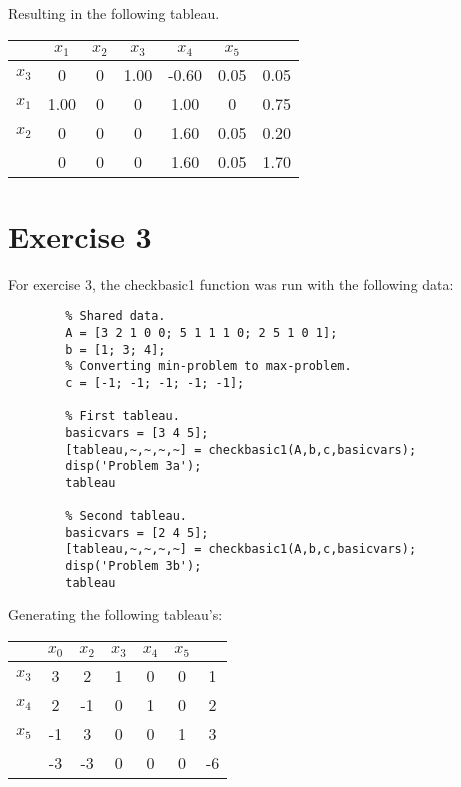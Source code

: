 \documentclass{article}
\begin{document}
    Resulting in the following tableau.

    \begin{center}
        \begin{tabular}{ | c | c c c c c | c | }
            \hline
                   & $x_1$ & $x_2$ & $x_3$ & $x_4$ & $x_5$ &  \\
            \hline
            $x_3$ & 0  & 0   & 1.00 & -0.60   &  0.05   & 0.05  \\
            $x_1$ & 1.00  & 0      & 0    & 1.00&  0   & 0.75 \\
            $x_2$ & 0  & 0  & 0    & 1.60  & 0.05 & 0.20 \\
            \hline
                  & 0  & 0  & 0    & 1.60   &  0.05  & 1.70 \\
            \hline
        \end{tabular}
    \end{center}

\section*{Exercise 3}

    For exercise 3, the checkbasic1 function was run with the following data:

    \begin{lstlisting}
        % Shared data.
        A = [3 2 1 0 0; 5 1 1 1 0; 2 5 1 0 1];
        b = [1; 3; 4];
        % Converting min-problem to max-problem.
        c = [-1; -1; -1; -1; -1];

        % First tableau.
        basicvars = [3 4 5];
        [tableau,~,~,~,~] = checkbasic1(A,b,c,basicvars);
        disp('Problem 3a');
        tableau

        % Second tableau.
        basicvars = [2 4 5];
        [tableau,~,~,~,~] = checkbasic1(A,b,c,basicvars);
        disp('Problem 3b');
        tableau
    \end{lstlisting}

    Generating the following tableau's:

        \begin{center}
            \begin{tabular}{ | c | c c c c c | c | }
                \hline
                      & $x_0$ & $x_2$ & $x_3$ & $x_4$ & $x_5$ &  \\
                \hline
                $x_3$ & 3  & 2   & 1 & 0   &  0   & 1  \\
                $x_4$ & 2  & -1 & 0    & 1 &  0   & 2 \\
                $x_5$ & -1  & 3  & 0    & 0  & 1 & 3 \\
                \hline
                      & -3  & -3  & 0    & 0   &  0  & -6 \\
                \hline
            \end{tabular}
        \end{center}
\end{document}
